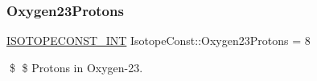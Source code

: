 \subsubsection{\texorpdfstring{Oxygen23\+Protons}{Oxygen23Protons}}
{\footnotesize\ttfamily \mbox{\hyperlink{group___isotope_const-_macros_ga5f18360b3e99483a35c32d789e62621c}{I\+S\+O\+T\+O\+P\+E\+C\+O\+N\+S\+T\+\_\+\+I\+NT}} Isotope\+Const\+::\+Oxygen23\+Protons = 8}

\$ \$ Protons in Oxygen-\/23. 